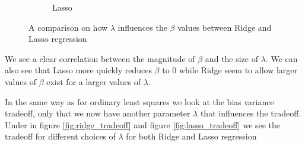 \documentclass[12pt]{article}
\begin{document}
\begin{figure}[H]
\begin{subfigure}{.5\textwidth}
    \caption{Lasso}
    \label{fig:}
  \end{subfigure}
  \caption{A comparison on how $\lambda$ influences the $\beta$ values between Ridge and Lasso regression}
  \label{fig:beta_lambda_rl}
\end{figure}
We see a clear correlation between the magnitude of $\beta$ and the size of $\lambda$. We can also see that Lasso more quickly reduces $\beta$ to 0 while Ridge seem to allow larger values of $\beta$ exist for a larger values of $\lambda$.

In the same way as for ordinary least squares we look at the bias variance tradeoff, only that we now have another parameter $\lambda$ that influences the tradeoff. Under in figure \ref{fig:ridge_tradeoff} and figure \ref{fig:lasso_tradeoff} we see the tradeoff for different choices of $\lambda$ for both Ridge and Lasso regression
\end{document}
